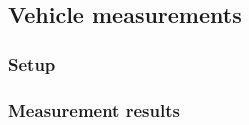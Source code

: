 \subsection{Vehicle measurements}
\label{sec:vehicle}

\subsubsection{Setup}
\label{sec:vehicle-setup}

\subsubsection{Measurement results}
\label{sec:vehicle-meas}

